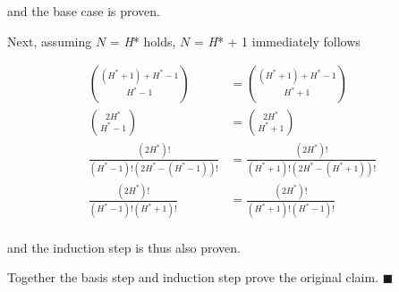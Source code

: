 \noindent and the base case is proven.

\vspace{5mm}

Next, assuming $N$ = \textit{H}* holds,  $N$ = \textit{H}* + 1 immediately follows

\begin{align*}
\binom{(H^* + 1) + H^* - 1}{H^* - 1} &= \binom{(H^* + 1) + H^* - 1}{H^* + 1} \\
\binom{2H^*}{H^* - 1} &= \binom{2H^*}{H^* + 1} \\
\frac{(2H^*)!}{(H^* - 1)!(2H^* - (H^* - 1))!} &= \frac{(2H^*)!}{(H^* + 1)!(2H^* - (H^* + 1))!} \\
\frac{(2H^*)!}{(H^* - 1)!(H^* + 1)!} &= \frac{(2H^*)!}{(H^* + 1)!(H^* - 1)!} \\
\end{align*}

\noindent and the induction step is thus also proven.

\vspace{5mm}  

Together the basis step and induction step prove the original claim. $\blacksquare$ 

